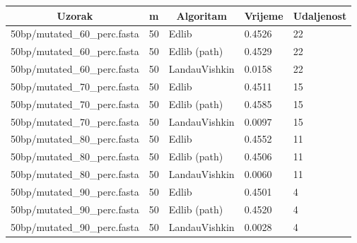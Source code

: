\documentclass[times, utf8, zavrsni]{fer}
\begin{document}
\begin{table}[]
\centering
\begin{tabular}{|l|l|l|l|l|}
\hline
\multicolumn{1}{|c|}{Uzorak} & \multicolumn{1}{c|}{m} & \multicolumn{1}{c|}{Algoritam} & \multicolumn{1}{c|}{Vrijeme} & \multicolumn{1}{c|}{Udaljenost} \\ \hline
50bp/mutated\_60\_perc.fasta & 50                     & Edlib                          & 0.4526                       & 22                              \\ \hline
50bp/mutated\_60\_perc.fasta & 50                     & Edlib (path)                   & 0.4529                       & 22                              \\ \hline
50bp/mutated\_60\_perc.fasta & 50                     & LandauVishkin                  & 0.0158                       & 22                              \\ \hline
50bp/mutated\_70\_perc.fasta & 50                     & Edlib                          & 0.4511                       & 15                              \\ \hline
50bp/mutated\_70\_perc.fasta & 50                     & Edlib (path)                   & 0.4585                       & 15                              \\ \hline
50bp/mutated\_70\_perc.fasta & 50                     & LandauVishkin                  & 0.0097                       & 15                              \\ \hline
50bp/mutated\_80\_perc.fasta & 50                     & Edlib                          & 0.4552                       & 11                              \\ \hline
50bp/mutated\_80\_perc.fasta & 50                     & Edlib (path)                   & 0.4506                       & 11                              \\ \hline
50bp/mutated\_80\_perc.fasta & 50                     & LandauVishkin                  & 0.0060                       & 11                              \\ \hline
50bp/mutated\_90\_perc.fasta & 50                     & Edlib                          & 0.4501                       & 4                               \\ \hline
50bp/mutated\_90\_perc.fasta & 50                     & Edlib (path)                   & 0.4520                       & 4                               \\ \hline
50bp/mutated\_90\_perc.fasta & 50                     & LandauVishkin                  & 0.0028                       & 4                               \\ \hline

\end{tabular}
\end{table}
\end{document}
